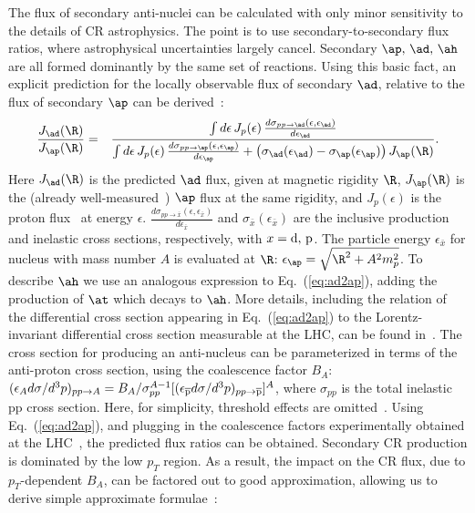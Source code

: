 The flux of secondary anti-nuclei can be calculated with only minor sensitivity to the details of CR astrophysics. The point is to use secondary-to-secondary flux ratios, where astrophysical uncertainties largely cancel. 
%
Secondary $\ap,\,\ad,\,\ah$ are all formed dominantly by the same set of reactions. 
Using this basic fact, an explicit prediction for the locally observable flux of secondary $\ad$, relative to the  flux of secondary $\ap$ can be derived~\cite{Ginzburg:1990sk,Katz:2009yd,Blum:2017qnn}:
%
\begin{eqnarray}
\label{eq:ad2ap}\frac{J_{\ad}(\R)}{J_{\ap}(\R)}&=&\frac{\int d\epsilon\,J_p(\epsilon)\,\frac{d\sigma_{pp\to\ad}(\epsilon,\epsilon_{\ad})}{d\epsilon_{\ad}}}{\int d\epsilon\,J_p(\epsilon)\,\frac{d\sigma_{pp\to\ap}(\epsilon,\epsilon_{\ap})}{d\epsilon_{\ap}}+\left(\sigma_{\ad}(\epsilon_{\ad})-\sigma_{\ap}(\epsilon_{\ap})\right)J_{\ap}(\R)}.
\end{eqnarray}
%
%
\noindent 
Here $J_{\ad}(\R)$ is the predicted $\ad$ flux, given at magnetic rigidity $\R$, $J_{\ap}(\R)$ is the (already well-measured~\cite{Aguilar:2016kjl}) $\ap$ flux at the same rigidity, and  
%
$J_p(\epsilon)$ is the proton flux~\cite{Aguilar:2015ooa} at energy $\epsilon$. 
%
$\frac{d\sigma_{pp\to\bar x}(\epsilon,\epsilon_{\bar x})}{d\epsilon_{\bar x}}$ and $\sigma_{\bar x}(\epsilon_{\bar x})$ are the inclusive production and inelastic cross sections, respectively, with $x={\rm d},\,{\rm p}$. 
% 
The particle energy $\epsilon_{\bar x}$ for nucleus with mass number $A$ is evaluated at $\R$:
$\epsilon_{\ap}=\sqrt{\R^2+A^2m_p^2}$. 
%
To describe $\ah$ we use an analogous expression to Eq.~(\ref{eq:ad2ap}), adding the production of $\at$ which decays to $\ah$. More details, including the relation of the differential cross section appearing in Eq.~(\ref{eq:ad2ap}) to the Lorentz-invariant differential cross section measurable at the LHC, can be found in~\cite{Blum:2017qnn}.
%
The cross section for producing an anti-nucleus can be parameterized in terms of the anti-proton cross section, using the coalescence factor $B_A$: 
$(\epsilon_A d\sigma/d^3p)_{pp\to A} = B_A/\sigma_{pp}^{A-1} [(\epsilon_{\overline{\rm p}} d\sigma/d^3p)_{pp\to \overline{\rm p}}]^A$, 
where $\sigma_{pp}$ is the total inelastic pp cross section. 
Here, for simplicity, threshold effects are omitted~\cite{Duperray:2002pj,Duperray:2003tv,Blum:2017qnn}. 
%
Using Eq.~(\ref{eq:ad2ap}), and plugging in the coalescence factors experimentally obtained at the LHC~\cite{Acharya:2017fvb}, the predicted flux ratios can be obtained. 
Secondary CR production is dominated by the low $p_T$ region. As a result, the impact on the CR flux, due to $p_T$-dependent $B_A$, can be factored out to good approximation, allowing us to derive simple approximate formulae~\cite{Blum:2017qnn}:
